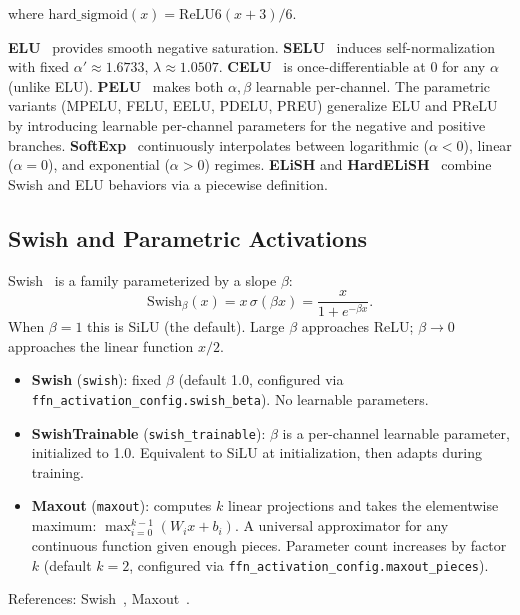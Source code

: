 \noindent where $\text{hard\_sigmoid}(x)=\text{ReLU6}(x+3)/6$.

\noindent\textbf{ELU}~\citep{clevert2016elu} provides smooth negative
saturation. \textbf{SELU}~\citep{klambauer2017selu} induces self-normalization
with fixed $\alpha'{\approx}1.6733$, $\lambda{\approx}1.0507$.
\textbf{CELU}~\citep{barron2017celu} is once-differentiable at 0 for any
$\alpha$ (unlike ELU). \textbf{PELU}~\citep{trottier2017pelu} makes both
$\alpha,\beta$ learnable per-channel. The parametric variants
(MPELU, FELU, EELU, PDELU, PREU) generalize ELU and PReLU by introducing
learnable per-channel parameters for the negative and positive branches.
\textbf{SoftExp}~\citep{godfrey2015softexp} continuously interpolates between
logarithmic ($\alpha<0$), linear ($\alpha=0$), and exponential ($\alpha>0$)
regimes. \textbf{ELiSH} and \textbf{HardELiSH}~\citep{basirat2019elish}
combine Swish and ELU behaviors via a piecewise definition.

\subsection{Swish and Parametric Activations}

Swish~\citep{ramachandran2017swish} is a family parameterized by a slope
$\beta$:
\[
  \text{Swish}_\beta(x) = x\,\sigma(\beta x) = \frac{x}{1+e^{-\beta x}}.
\]
When $\beta=1$ this is SiLU (the default). Large $\beta$ approaches
ReLU; $\beta\to 0$ approaches the linear function $x/2$.

\begin{itemize}[leftmargin=*]
  \item \textbf{Swish} (\texttt{swish}): fixed $\beta$ (default 1.0, configured
    via \texttt{ffn\_activation\_config.swish\_beta}). No learnable parameters.
  \item \textbf{SwishTrainable} (\texttt{swish\_trainable}): $\beta$ is a
    per-channel learnable parameter, initialized to 1.0. Equivalent to SiLU at
    initialization, then adapts during training.
  \item \textbf{Maxout} (\texttt{maxout}): computes $k$ linear projections and
    takes the elementwise maximum: $\max_{i=0}^{k-1}(W_i x + b_i)$.
    A universal approximator for any continuous function given enough pieces.
    Parameter count increases by factor $k$ (default $k=2$, configured via
    \texttt{ffn\_activation\_config.maxout\_pieces}).
\end{itemize}

\noindent References: Swish~\citep{ramachandran2017swish},
Maxout~\citep{goodfellow2013maxout}.

